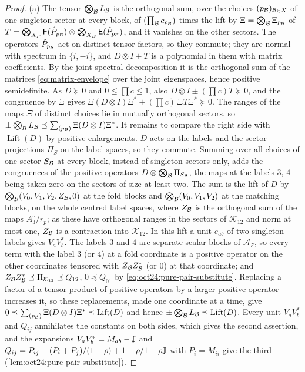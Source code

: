 \begin{proof}
(a) The tensor $\bigotimes_\mathcal B L_\mathcal B$ is the orthogonal sum, over the choices
$(p_\mathcal B)_{\mathcal B\in X}$ of one singleton sector at every block, of
$(\prod_\mathcal B c_{p_\mathcal B})$ times the lift by $\Xi=\bigotimes_\mathcal B\Xi_{p_\mathcal B}$ of
$T=\bigotimes_{X_F}\mathsf F(\hat P_{p_\mathcal B})\otimes\bigotimes_{X_E}\mathsf E(\hat P_{p_\mathcal B})$,
and it vanishes on the other sectors. The operators $\hat P_{p_\mathcal B}$ act on distinct
tensor factors, so they commute; they are normal with spectrum in $\{i,-i\}$, and
$D\otimes I\pm T$ is a polynomial in them with matrix coefficients. By the joint
spectral decomposition it is the orthogonal sum of the matrices
\eqref{eq:matrix-envelope} over the joint eigenspaces, hence positive semidefinite.
As $D\succeq0$ and $0\le\prod c\le1$, also $D\otimes I\pm(\prod c)T\succeq0$, and the
congruence by $\Xi$ gives
$\Xi(D\otimes I)\Xi^*\pm(\prod c)\,\Xi T\Xi^*\succeq0$. The ranges of the maps $\Xi$ of
distinct choices lie in mutually orthogonal sectors, so
$\pm\bigotimes_\mathcal B L_\mathcal B\preceq\sum_{(p_\mathcal B)}\Xi(D\otimes I)\Xi^*$. It remains to compare
the right side with $\operatorname{Lift}(D)$ by positive enlargements. $D$ acts on the
labels and the sector projections $\Pi_S$ on the label spaces, so they commute.
Summing over all choices of one sector $S_\mathcal B$ at every block, instead of singleton
sectors only, adds the congruences of the positive operators
$D\otimes\bigotimes_\mathcal B\Pi_{S_\mathcal B}$, the maps at the labels $3$, $4$ being taken zero on the
sectors of size at least two. The sum is the lift of $D$ by
$\bigotimes_\mathcal B(V_0,V_1,V_2,Z_\mathcal B,0)$ at the fold blocks and $\bigotimes_\mathcal B(V_0,V_1,V_2)$ at
the matching blocks, on the whole centred label spaces, where $Z_\mathcal B$ is the
orthogonal sum of the maps $A_3^\circ/r_p$; as these have orthogonal ranges in the
sectors of $\mathcal K_{12}$ and norm at most one, $Z_\mathcal B$ is a contraction into
$\mathcal K_{12}$. In this lift a unit $e_{ab}$ of two singleton labels gives
$V_aV_b^*$. The labels $3$ and $4$ are separate scalar blocks of $\mathcal A_F$,
so every term with the label $3$ (or $4$) at a fold coordinate is a positive operator
on the other coordinates tensored with $Z_\mathcal B Z_\mathcal B^*$ (or $0$) at that coordinate; and
$Z_\mathcal B Z_\mathcal B^*\preceq\Pi_{\mathcal K_{12}}\preceq Q_{12}$, $0\preceq Q_{01}$ by
\eqref{eq:oct24:pure-pair-substitute}. Replacing a factor of a tensor product of
positive operators by a larger positive operator increases it, so these replacements,
made one coordinate at a time, give
$0\preceq\sum_{(p_\mathcal B)}\Xi(D\otimes I)\Xi^*\preceq\operatorname{Lift}(D)$ and hence
$\pm\bigotimes_\mathcal B L_\mathcal B\preceq\operatorname{Lift}(D)$. Every unit
$V_aV_b^*$ and $Q_{ij}$ annihilates the constants on both sides, which
gives the second assertion, and the expansions
$V_aV_b^*=M_{ab}-\mathbb J$ and
$Q_{ij}=P_{ij}-(P_i+P_j)/(1+\rho)+1-\rho/1+\rho\mathbb J$ with $P_i=M_{ii}$ give the third
(\cref{lem:oct24:pure-pair-substitute}).


\end{proof}
